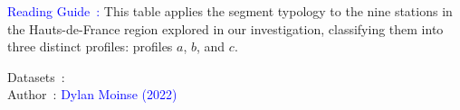     \begin{table}[h!]  
    \centering  
    \renewcommand{\arraystretch}{1.5}  
    \caption{Reuse of the  reference applied to the nine stations explored in the Hauts-de-France region.}  
    \label{table-chap4:typologie-gares-hdf}  
        \vspace{5pt}  
        \begin{flushleft}\scriptsize{  
        \textcolor{blue}{Reading Guide~:} This table applies the segment typology to the nine stations in the Hauts-de-France region explored in our investigation, classifying them into three distinct profiles: profiles \(a\), \(b\), and \(c\).  
        }\end{flushleft}  
        \begin{flushright}\scriptsize  
        Datasets~: \textcolor{blue}{\textcite{sncf_gares__connexions_gares_2024}}  
        \\
        Author~: \textcolor{blue}{Dylan Moinse (2022)}  
        \end{flushright}  
        \end{table}